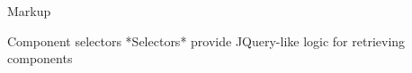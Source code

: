 \begin{frame}[fragile]{Markup}
\end{frame}

\begin{frame}[fragile]{Component selectors}
*Selectors* provide JQuery-like logic for retrieving components
\end{frame}